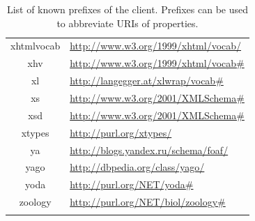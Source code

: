 \documentclass{article}
\begin{document}
\begin{longtable}{ c | p{8cm} }
		xhtmlvocab & \url{http://www.w3.org/1999/xhtml/vocab/} \\
		xhv & \url{http://www.w3.org/1999/xhtml/vocab#} \\
		xl & \url{http://langegger.at/xlwrap/vocab#} \\
		xs & \url{http://www.w3.org/2001/XMLSchema#} \\
		xsd & \url{http://www.w3.org/2001/XMLSchema#} \\
		xtypes & \url{http://purl.org/xtypes/} \\
		ya & \url{http://blogs.yandex.ru/schema/foaf/} \\
		yago & \url{http://dbpedia.org/class/yago/} \\
		yoda & \url{http://purl.org/NET/yoda#} \\
		zoology & \url{http://purl.org/NET/biol/zoology#} \\
  \hline  
	\caption{List of known prefixes of the client. Prefixes can be used to abbreviate URIs of properties.}
\end{longtable}
\end{document}
